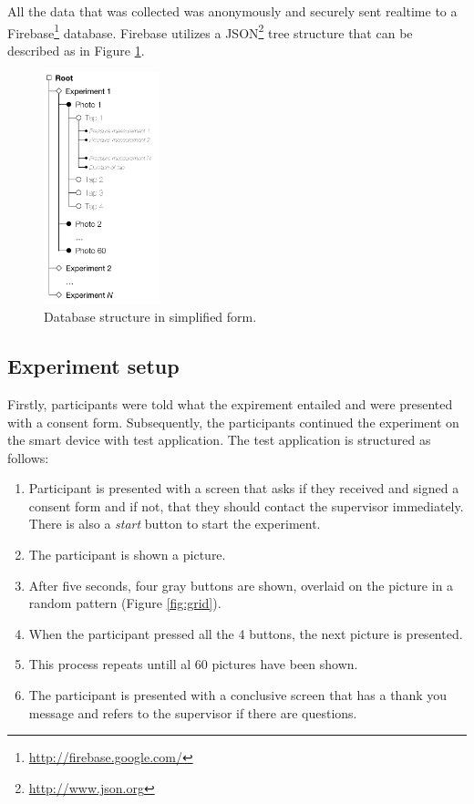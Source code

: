 \documentclass{sigchi}
\begin{document}
All the data that was collected was anonymously and securely sent realtime to a Firebase\footnote{\url{http://firebase.google.com/}} database. Firebase utilizes a JSON\footnote{\url{http://www.json.org}} tree structure that can be described as in Figure \ref{fig:datastructure}.
\begin{figure}[h]
    \centering
    \includegraphics[width=0.3\textwidth]{images/Datastructure.png}
    \caption{Database structure in simplified form.}
    \label{fig:datastructure}
\end{figure}


\subsection{Experiment setup} %
\label{sub:experiment_setup}
Firstly, participants were told what the expirement entailed and were presented with a consent form. Subsequently, the participants continued the experiment on the smart device with test application. The test application is structured as follows:
\begin{enumerate}
  \item Participant is presented with a screen that asks if they received and signed a consent form and if not, that they should contact the supervisor immediately. There is also a \textit{start} button to start the experiment.
  \item The participant is shown a picture.
  \item After five seconds, four gray buttons are shown, overlaid on the picture in a random pattern (Figure \ref{fig:grid}).
  \item When the participant pressed all the 4 buttons, the next picture is presented.
  \item This process repeats untill al 60 pictures have been shown.
  \item The participant is presented with a conclusive screen that has a thank you message and refers to the supervisor if there are questions.
\end{enumerate}
\end{document}
